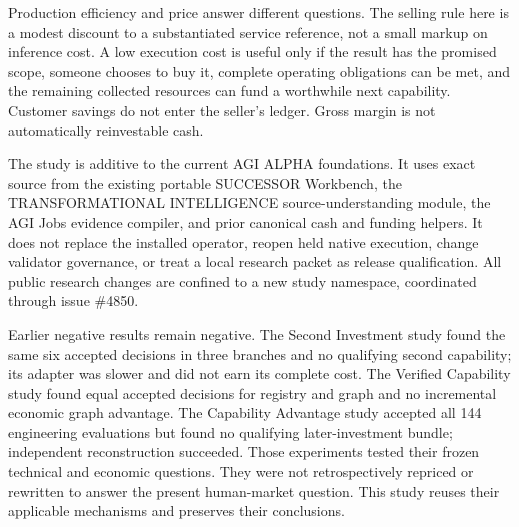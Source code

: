 \documentclass[11pt,letterpaper]{article}
\begin{document}
Production efficiency and price answer different questions. The selling rule here is a modest discount to a substantiated service reference, not a small markup on inference cost. A low execution cost is useful only if the result has the promised scope, someone chooses to buy it, complete operating obligations can be met, and the remaining collected resources can fund a worthwhile next capability. Customer savings do not enter the seller's ledger. Gross margin is not automatically reinvestable cash.

The study is additive to the current AGI ALPHA foundations. It uses exact source from the existing portable SUCCESSOR Workbench, the TRANSFORMATIONAL INTELLIGENCE source-understanding module, the AGI Jobs evidence compiler, and prior canonical cash and funding helpers. It does not replace the installed operator, reopen held native execution, change validator governance, or treat a local research packet as release qualification. All public research changes are confined to a new study namespace, coordinated through issue \#4850\cite{alpha,coordination}.

Earlier negative results remain negative. The Second Investment study found the same six accepted decisions in three branches and no qualifying second capability; its adapter was slower and did not earn its complete cost. The Verified Capability study found equal accepted decisions for registry and graph and no incremental economic graph advantage. The Capability Advantage study accepted all 144 engineering evaluations but found no qualifying later-investment bundle; independent reconstruction succeeded\cite{second,verified,capability}. Those experiments tested their frozen technical and economic questions. They were not retrospectively repriced or rewritten to answer the present human-market question. This study reuses their applicable mechanisms and preserves their conclusions.
\end{document}
